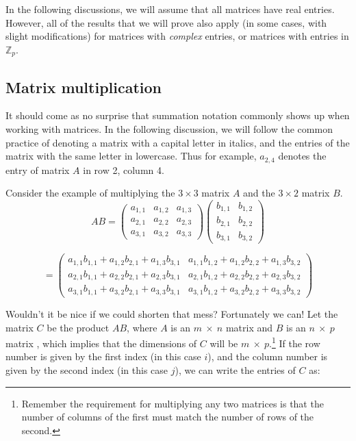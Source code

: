 In the following discussions, we will assume that all matrices have real entries.  However, all of the results that we will prove also apply (in some cases, with slight modifications)  for matrices with \emph{complex} entries, or matrices with entries in $\mathbb{Z}_p$.

\subsection{Matrix multiplication}
It should come as no surprise that summation notation commonly shows up when working with matrices. 
In the following discussion, we will follow the common practice of denoting a matrix with a capital 
letter in italics, and the entries of the matrix with the same letter in lowercase. 
Thus for example, $a_{2,4}$ denotes the entry of matrix $A$ in row 2, column 4.
   
 Consider the example of multiplying the $3 \times 3$ matrix $A$ and the $3 \times 2$ matrix $B$. 
\[{A}{B} = \left( \begin{array}{ccc}
a_{1,1} & a_{1,2}  & a_{1,3}  \\
a_{2,1} & a_{2,2} & a_{2,3} \\
a_{3,1} & a_{3,2} & a_{3,3} \end{array} \right)
 \left( \begin{array}{cc}
b_{1,1} & b_{1,2}    \\
b_{2,1} & b_{2,2}  \\
b_{3,1} & b_{3,2}  \end{array} \right) \]

\[= \left( \begin{array}{cc}
a_{1,1} b_{1,1} + a_{1,2} b_{2,1} + a_{1,3} b_{3,1} & a_{1,1} b_{1,2} + a_{1,2} b_{2,2} + a_{1,3} b_{3,2}  \\
a_{2,1} b_{1,1} + a_{2,2} b_{2,1} + a_{2,3} b_{3,1} & a_{2,1} b_{1,2} + a_{2,2} b_{2,2} + a_{2,3} b_{3,2}  \\
a_{3,1} b_{1,1} + a_{3,2} b_{2,1} + a_{3,3} b_{3,1} & a_{3,1} b_{1,2} + a_{3,2} b_{2,2} + a_{3,3} b_{3,2}  \end{array} \right) \]

Wouldn't it be nice if we could shorten that mess?  Fortunately we can!  Let the matrix ${C}$ be the product ${A} {B}$, where ${A}$ is an $m ~\times ~n$ matrix  and ${B}$ is an $n ~\times ~p$ matrix , which implies that the dimensions of ${C}$ will be $m ~ \times ~ p$.\footnote{Remember the requirement for multiplying any two matrices is that the number of columns of the first must match the number of rows of the second.}  If the row number is given by the first index (in this case $i$), and the column number is given by the second index (in this case $j$), we can write the entries of  ${C}$ as: 

